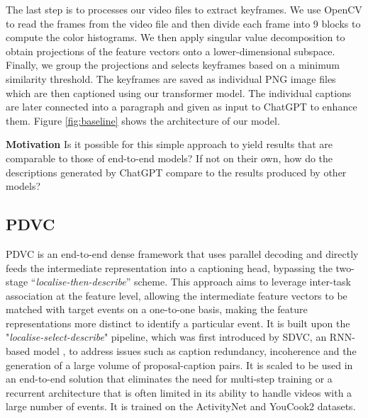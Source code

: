 The last step is to processes our video files to extract keyframes. We use OpenCV to read the frames from the video file and then divide each frame into 9 blocks to compute the color histograms. We then apply singular value decomposition to obtain projections of the feature vectors onto a lower-dimensional subspace. Finally, we group the projections and selects keyframes based on a minimum similarity threshold. The keyframes are saved as individual PNG image files which are then captioned using our transformer model. The individual captions are later connected into a paragraph and given as input to ChatGPT to enhance them. Figure \ref{fig:baseline} shows the architecture of our model.

\textbf{Motivation} Is it possible for this simple approach to yield results that are comparable to those of end-to-end models? If not on their own, how do the descriptions generated by ChatGPT compare to the results produced by other models?

\subsection{PDVC}
PDVC \cite{le2021pdvc} is an end-to-end dense framework that uses parallel decoding and directly feeds the intermediate representation into a captioning head, bypassing the two-stage “\textit{localise-then-describe}” scheme. This approach aims to leverage inter-task association at the feature level, allowing the intermediate feature vectors to be matched with target events on a one-to-one basis, making the feature representations more distinct to identify a particular event. It is built upon the "\textit{localise-select-describe}" pipeline, which was first introduced by SDVC, an RNN-based model \cite{Mun2019StreamlinedDV}, to address issues such as caption redundancy, incoherence and the generation of a large volume of proposal-caption pairs. It is scaled to be used in an end-to-end solution that eliminates the need for multi-step training or a recurrent architecture that is often limited in its ability to handle videos with a large number of events.  It is trained on the ActivityNet and YouCook2 datasets.

